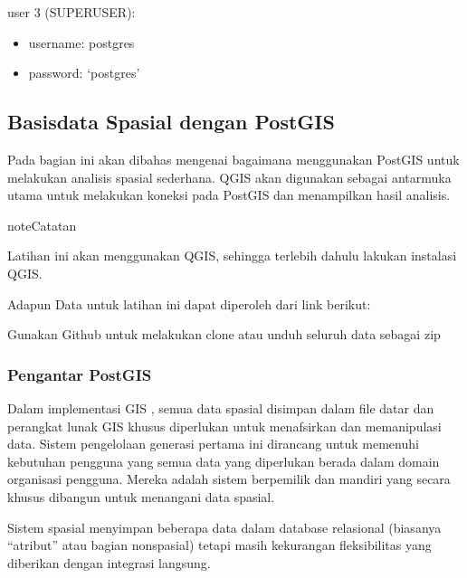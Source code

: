 \documentclass[letterpaper,10pt,english]{sphinxmanual}
\begin{document}
user 3 (SUPERUSER):
\begin{itemize}
\item {} 
username: postgres

\item {} 
password: ‘postgres’

\end{itemize}


\subsection{Basisdata Spasial dengan PostGIS}
\label{\detokenize{sesi2/postgisquery:basisdata-spasial-dengan-postgis}}\label{\detokenize{sesi2/postgisquery::doc}}
Pada bagian ini akan dibahas mengenai bagaimana menggunakan PostGIS untuk melakukan analisis spasial sederhana. QGIS akan digunakan sebagai antarmuka utama untuk melakukan koneksi pada PostGIS dan menampilkan hasil analisis.

\begin{sphinxadmonition}{note}{Catatan}

Latihan ini akan menggunakan QGIS, sehingga terlebih dahulu lakukan instalasi QGIS.

Adapun Data untuk latihan ini dapat diperoleh dari link berikut:


Gunakan Github untuk melakukan clone atau unduh seluruh data sebagai zip
\end{sphinxadmonition}


\subsubsection{Pengantar PostGIS}
\label{\detokenize{sesi2/postgisquery:pengantar-postgis}}
Dalam implementasi GIS , semua data spasial disimpan dalam file datar dan perangkat lunak GIS khusus diperlukan untuk menafsirkan dan memanipulasi data. Sistem pengelolaan generasi pertama ini dirancang untuk memenuhi kebutuhan pengguna yang semua data yang diperlukan berada dalam domain organisasi pengguna. Mereka adalah sistem berpemilik dan mandiri yang secara khusus dibangun untuk menangani data spasial.

Sistem spasial  menyimpan beberapa data dalam database relasional (biasanya “atribut” atau bagian non\sphinxhyphen{}spasial) tetapi masih kekurangan fleksibilitas yang diberikan dengan integrasi langsung.
\begin{quote}

\end{quote}
\end{document}
